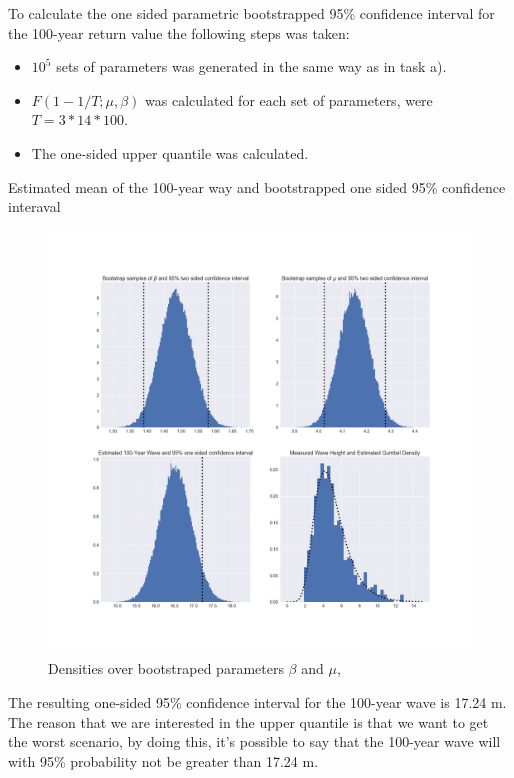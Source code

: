 \documentclass[a4paper]{article}
\begin{document}
To calculate the one sided parametric bootstrapped 95\% confidence interval for the 100-year return value the following steps was taken:

\begin{itemize}
    \item $10^5$ sets of parameters was generated in the same way as in task a).
    \item $F(1-1/T; \mu, \beta)$ was calculated for each set of parameters, were $T = 3*14*100$.
    \item The one-sided upper quantile was calculated.
\end{itemize}

\begin{table}[H]
    \centering
    \caption{Estimated mean of the 100-year way and bootstrapped one sided 95\% confidence interaval}
    \label{tab:bigwave}
    
\end{table}

\begin{figure}[H]
    \centering
    \includegraphics[width = 1.0\textwidth]{images/results_bootstrap.png}
    \caption{Densities over bootstraped parameters $\beta$ and $\mu$, }
    \label{}
\end{figure}

The resulting one-sided 95\% confidence interval for the 100-year wave is 17.24 m. The reason that we are interested in the upper quantile is that we want to get the worst scenario, by doing this, it's possible to say that the 100-year wave will with 95\% probability not be greater than 17.24 m. 
\end{document}
